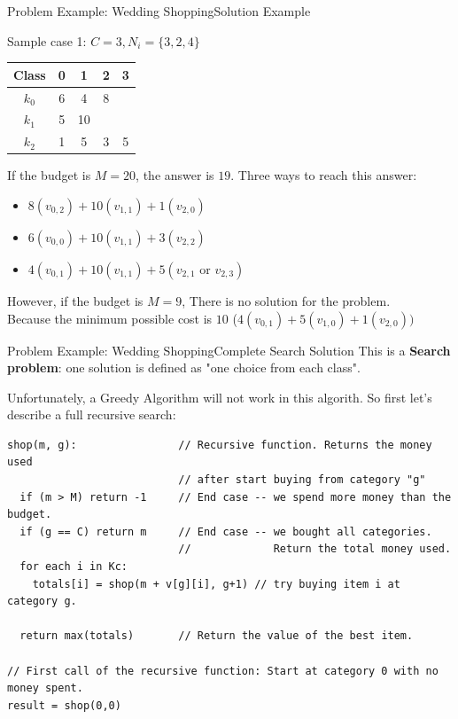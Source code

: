 \begin{frame}{Problem Example: Wedding Shopping}{Solution Example}
  \begin{block}{Sample case 1: $C=3, N_i = \{3,2,4\}$}
  \begin{tabular}{|c|cccc|}
    Class & 0 & 1 & 2 & 3\\
    \hline
    $k_0$ & 6 & 4 & 8 & \\
    $k_1$ & 5 & 10 & & \\
    $k_2$ & 1 & 5 & 3 & 5\\
  \end{tabular}
  \end{block}
  \medskip

  If the budget is $M=20$, the answer is $19$. Three ways to reach this answer:
  \begin{itemize}
    \item $8(v_{0,2})+10(v_{1,1})+1(v_{2,0})$
    \item $6(v_{0,0})+10(v_{1,1})+3(v_{2,2})$
    \item $4(v_{0,1})+10(v_{1,1})+5(v_{2,1} \text{ or } v_{2,3})$
  \end{itemize}
  \bigskip

  However, if the budget is $M=9$, There is no solution for the problem.\\
  Because the minimum possible cost is $10$ ($4(v_{0,1})+5(v_{1,0})+1(v_{2,0}))$
\end{frame}

\begin{frame}[fragile]{Problem Example: Wedding Shopping}{Complete Search Solution}
  This is a {\bf Search problem}: one solution is defined as "one choice from each class".\medskip

  Unfortunately, a Greedy Algorithm will not work in this algorith. So first let's describe a full recursive search:


{\smaller
\begin{verbatim}
shop(m, g):                // Recursive function. Returns the money used
                           // after start buying from category "g"
  if (m > M) return -1     // End case -- we spend more money than the budget.
  if (g == C) return m     // End case -- we bought all categories.
                           //             Return the total money used.
  for each i in Kc:
    totals[i] = shop(m + v[g][i], g+1) // try buying item i at category g.

  return max(totals)       // Return the value of the best item.

// First call of the recursive function: Start at category 0 with no money spent.
result = shop(0,0)
\end{verbatim}
}
\end{frame}

